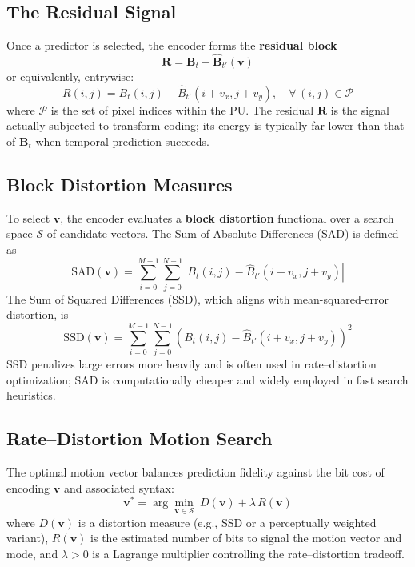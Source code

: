 \documentclass[11pt,journal,onecolumn]{IEEEtran}
\begin{document}
\subsection{The Residual Signal}
Once a predictor is selected, the encoder forms the \textbf{residual block}
\begin{equation}
\mathbf{R} = \mathbf{B}_t - \hat{\mathbf{B}}_{t'}(\mathbf{v})
\end{equation}
or equivalently, entrywise:
\begin{equation}
R(i, j) = B_t(i, j) - \hat{B}_{t'}(i + v_x, j + v_y), \quad \forall\, (i, j) \in \mathcal{P}
\end{equation}
where $\mathcal{P}$ is the set of pixel indices within the PU. The residual $\mathbf{R}$ is the signal actually subjected to transform coding; its energy is typically far lower than that of $\mathbf{B}_t$ when temporal prediction succeeds.

\subsection{Block Distortion Measures}
To select $\mathbf{v}$, the encoder evaluates a \textbf{block distortion} functional over a search space $\mathcal{S}$ of candidate vectors. The Sum of Absolute Differences (SAD) is defined as
\begin{equation}
\mathrm{SAD}(\mathbf{v}) = \sum_{i=0}^{M-1} \sum_{j=0}^{N-1} \left| B_t(i, j) - \hat{B}_{t'}(i + v_x, j + v_y) \right|
\end{equation}
The Sum of Squared Differences (SSD), which aligns with mean-squared-error distortion, is
\begin{equation}
\mathrm{SSD}(\mathbf{v}) = \sum_{i=0}^{M-1} \sum_{j=0}^{N-1} \left( B_t(i, j) - \hat{B}_{t'}(i + v_x, j + v_y) \right)^2
\end{equation}
SSD penalizes large errors more heavily and is often used in rate--distortion optimization; SAD is computationally cheaper and widely employed in fast search heuristics.

\subsection{Rate--Distortion Motion Search}
The optimal motion vector balances prediction fidelity against the bit cost of encoding $\mathbf{v}$ and associated syntax:
\begin{equation}
\mathbf{v}^* = \arg\min_{\mathbf{v} \in \mathcal{S}} \; D(\mathbf{v}) + \lambda \, R(\mathbf{v})
\end{equation}
where $D(\mathbf{v})$ is a distortion measure (e.g., SSD or a perceptually weighted variant), $R(\mathbf{v})$ is the estimated number of bits to signal the motion vector and mode, and $\lambda > 0$ is a Lagrange multiplier controlling the rate--distortion tradeoff.
\end{document}
